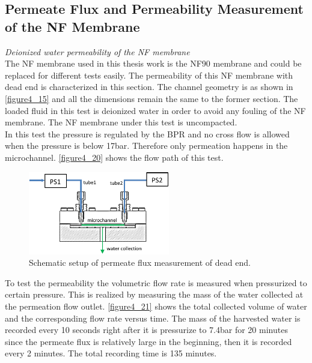 \clearpage

\subsection{Permeate Flux and Permeability Measurement of the NF Membrane}
\label{4_3_3}
\noindent \textit{Deionized water permeability of the NF membrane}\\

The NF membrane used in this thesis work is the NF90 membrane and could be replaced for different tests easily. The permeability of this NF membrane with dead end is characterized in this section. The channel geometry is as shown in \autoref{figure4_15} and all the dimensions remain the same to the former section. The loaded fluid in this test is deionized water in order to avoid any fouling of the NF membrane. The NF membrane under this test is uncompacted.\\

In this test the pressure is regulated by the BPR and no cross flow is allowed when the pressure is below 17bar. Therefore only permeation happens in the microchannel. \autoref{figure4_20} shows the flow path of this test.\\

\begin{figure}[ht]%
\centering
\includegraphics[width=0.55\textwidth]{figures/packagingandtestunderhighpressure/figure4_20}%
\caption{Schematic setup of permeate flux measurement of dead end.}%
\label{figure4_20}%
\end{figure}

To test the permeability the volumetric flow rate is measured when pressurized to certain pressure. This is realized by measuring the mass of the water collected at the permeation flow outlet. \autoref{figure4_21} shows the total collected volume of water and the corresponding flow rate versus time. The mass of the harvested water is recorded every 10 seconds right after it is pressurize to 7.4bar for 20 minutes since the permeate flux is relatively large in the beginning, then it is recorded every 2 minutes. The total recording time is 135 minutes.\\

